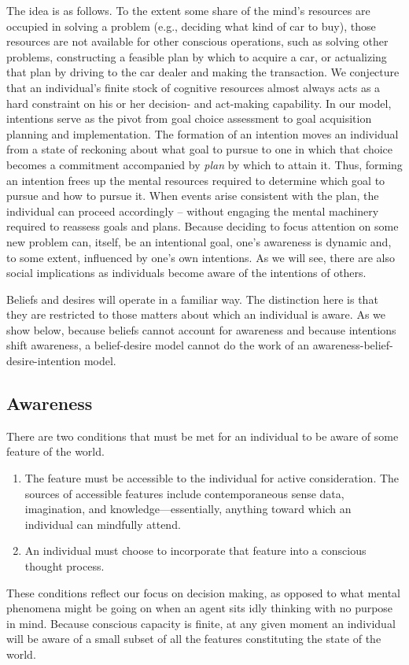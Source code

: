 \documentclass[
11pt,
titlepage,
reqno,
]{article}%
\theoremstyle{definition}
\begin{document}
	The idea is as follows.
	To the extent some share of the mind's resources are occupied in solving a problem (e.g., deciding what kind of car to buy), those resources are not available for other conscious operations, such as solving other problems, constructing a feasible plan by which to acquire a car, or actualizing that plan by driving to the car dealer and making the transaction.
	We conjecture that an individual's finite stock of cognitive resources almost always acts as a hard constraint on his or her decision- and act-making capability.
	In our model, intentions serve as the pivot from goal choice assessment to goal acquisition planning and implementation.
	The formation of an intention moves an individual from a state of reckoning about what goal to pursue to one in which that choice becomes a commitment accompanied by \textit{plan} by which to attain it.
	Thus, forming an intention frees up the mental resources required to determine which goal to pursue and how to pursue it.
	When events arise consistent with the plan, the individual can proceed accordingly -- without engaging the mental machinery required to reassess goals and plans.
	Because deciding to focus attention on some new problem can, itself, be an intentional goal, one's awareness is dynamic and, to some extent, influenced by one's own intentions.
	As we will see, there are also social implications as individuals become aware of the intentions of others.  
	
	Beliefs and desires will operate in a familiar way. 
	The distinction here is that they are restricted to those matters about which an individual is aware.
	As we show below, because beliefs cannot account for awareness and because intentions shift awareness, a belief-desire model cannot do the work of an awareness-belief-desire-intention model.
	
	\subsection{Awareness}
	
	There are two conditions that must be met for an individual to be aware of some feature of the world. 
	\begin{enumerate}
		\item The feature must be accessible to the individual for active consideration. The sources of accessible features include contemporaneous sense data, imagination, and knowledge---essentially, anything toward which an individual can mindfully attend.
		\item An individual must choose to incorporate that feature into a conscious thought process.
	\end{enumerate}
	These conditions reflect our focus on decision making, as opposed to what mental phenomena might be going on when an agent sits idly thinking with no purpose in mind. 
	Because conscious capacity is finite, at any given moment an individual will be aware of a small subset of all the features constituting the state of the world.
	
\end{document}
